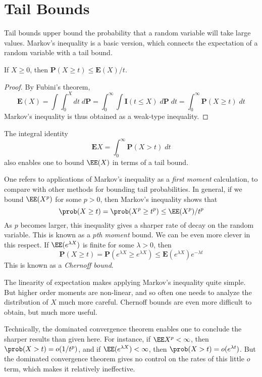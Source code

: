 \section{Tail Bounds}

Tail bounds upper bound the probability that a random variable will take large values. Markov's inequality is a basic version, which connects the expectation of a random variable with a tail bound.

\begin{theorem}
    If $X \geq 0$, then $\mathbf{P}(X \geq t) \leq \mathbf{E}(X) / t$.
\end{theorem}
\begin{proof}
    By Fubini's theorem,
    \[ \mathbf{E}(X) = \int \int_0^X dt\; d\mathbf{P} = \int_0^\infty \int \mathbf{I}(t \leq X)\; d\mathbf{P}\; dt = \int_0^\infty \mathbf{P}(X \geq t)\; dt \]
    Markov's inequality is thus obtained as a weak-type inequality.
\end{proof}

\begin{remark}
    The integral identity
    \[ \mathbf{E} X = \int_0^\infty \mathbf{P}(X > t)\; dt \]
    also enables one to bound $\EE(X)$ in terms of a tail bound.
\end{remark}

One refers to applications of Markov's inequality as a {\it first moment} calculation, to compare with other methods for bounding tail probabilities. In general, if we bound $\EE(X^p)$ for some $p > 0$, then Markov's inequality shows that
%
\[ \prob(X \geq t) = \prob(X^p \geq t^p) \leq \EE(X^p)/t^p \]
%
As $p$ becomes larger, this inequality gives a sharper rate of decay on the random variable. This is known as a {\it $p$th moment} bound. We can be even more clever in this respect. If $\EE(e^{\lambda X})$ is finite for some $\lambda > 0$, then
%
\[ \mathbf{P}(X \geq t) = \mathbf{P}(e^{\lambda X} \geq e^{\lambda X}) \leq \mathbf{E}(e^{\lambda X}) e^{-\lambda t} \]
%
This is known as a {\it Chernoff bound}.

\begin{remark}
    The linearity of expectation makes applying Markov's inequality quite simple. But higher order moments are non-linear, and so often one needs to analyze the distribution of $X$ much more careful. Chernoff bounds are even more difficult to obtain, but much more useful.
\end{remark}

\begin{remark}
    Technically, the dominated convergence theorem enables one to conclude the sharper results than given here. For instance, if $\EE X^p < \infty$, then $\prob(X > t) = o(1/t^p)$, and if $\EE(e^{\lambda X}) < \infty$, then $\prob(X > t) = o(e^{\lambda t})$. But the dominated convergence theorem gives no control on the rates of this little $o$ term, which makes it relatively ineffective.
\end{remark}

